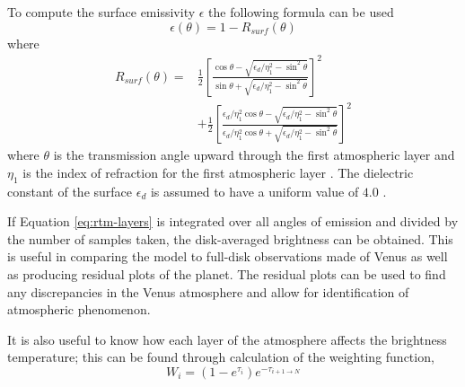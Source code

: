 To compute the surface emissivity $\epsilon$ the following formula can be used
\begin{equation}\label{eq:rtm-esurf}
\epsilon(\theta) = 1-R_{surf}(\theta)
\end{equation}
where
\begin{equation}\label{eq:rtm-rsurf}
\begin{split}
R_{surf}(\theta) =& \frac{1}{2} \left[ \frac{\cos\theta - \sqrt{\epsilon_d/\eta_1^2-\sin^2\theta}}{\sin\theta + \sqrt{\epsilon_d/\eta_1^2-\sin^2\theta}} \right]^2\\
&+\frac{1}{2} \left[ \frac{\epsilon_d/\eta_1^2 \cos\theta - \sqrt{\epsilon_d/\eta_1^2-\sin^2\theta}}{\epsilon_d/\eta_1^2 \cos\theta + \sqrt{\epsilon_d/\eta_1^2-\sin^2\theta}} \right]^2
\end{split}
\end{equation}
where $\theta$ is the transmission angle upward through the first atmospheric layer and $\eta_1$ is the index of refraction for the first atmospheric layer \cite{Jenkins-2002}. The dielectric constant of the surface $\epsilon_d$ is assumed to have a uniform value of $4.0$ \cite{Pettengill-1992}.

If Equation \ref{eq:rtm-layers} is integrated over all angles of emission and divided by the number of samples taken, the disk-averaged brightness can be obtained. This is useful in comparing the model to full-disk observations made of Venus as well as producing residual plots of the planet. The residual plots can be used to find any discrepancies in the Venus atmosphere and allow for identification of atmospheric phenomenon. 

It is also useful to know how each layer of the atmosphere affects the brightness temperature; this can be found through calculation of the weighting function,
\begin{equation}
W_i = (1-e^{\tau_i}) e^{-\tau_{i+1 \rightarrow N}}
\end{equation}











